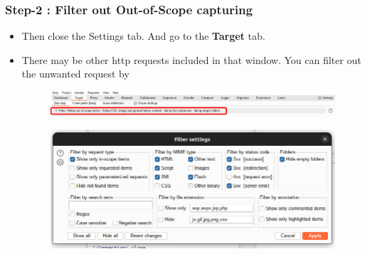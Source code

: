 \documentclass[
	a4paper, %
	12pt, %
]{CSSullivanBusinessReport}
\begin{document}
\begin{fullwidth}
\begin{itemize}
\end{itemize}


\subsubsection*{Step-2 : Filter out Out-of-Scope capturing}
\begin{itemize}
    \item Then close the Settings tab. And go to the {\color{orange}\textbf{Target}} tab.
    \item There may be other http requests included in that window. You can filter out the unwanted request by 
    \begin{figure}[H]
    \centering
        \includegraphics[width=1\linewidth]{Images//Setting Test Scope/filter.png}
    \end{figure}
    \begin{figure}[H]
    \centering
        \includegraphics[width=1\linewidth]{Images/Setting Test Scope/filter-2.png}   
    \end{figure} 

\end{itemize}
\end{fullwidth}



\end{document}

